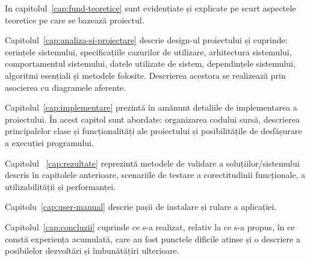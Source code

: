 In capitolul~\ref{cap:fund-teoretice}  sunt evidențiate și explicate pe scurt aspectele teoretice pe care se bazează proiectul.

Capitolul~\ref{cap:analiza-si-proiectare}  descrie design-ul proiectului și cuprinde: cerințele sistemului, specificațiile cazurilor de utilizare, arhitectura sistemului, comportamentul sistemului, datele utilizate de sistem, dependințele sistemului, algoritmi esențiali și metodele folosite. Descrierea acestora se realizează prin asocierea cu diagramele aferente.


Capitolul~\ref{cap:implementare}  prezintă în amănunt detaliile de implementarea a proiectului. În acest capitol sunt abordate: organizarea codului sursă, descrierea principalelor clase și funcționalități ale proiectului și posibilitățile de desfășurare a execuției programului. 

Capitolul ~\ref{cap:rezultate}  reprezintă metodele de validare a soluțiilor/sistemului descris în capitolele anterioare, scenariile de testare a corectitudinii funcționale, a utilizabilității și performanței. 

Capitolu~\ref{cap:user-manual} descrie pașii de instalare și rulare a aplicației.

Capitolul~\ref{cap:concluzii} cuprinde ce s-a realizat, relativ la ce s-a propus, în ce constă experiența acumulată, care au fost punctele dificile atinse și o descriere a posibilelor dezvoltări și îmbunătățiri ulterioare.
